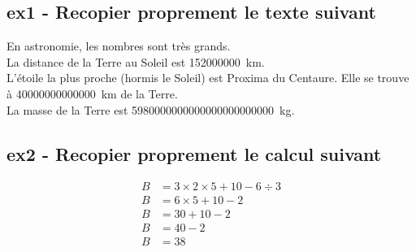\documentclass[11pt]{article}
\begin{document}
\subsection*{ex1 - Recopier proprement le texte suivant}

En astronomie, les nombres sont très grands. \\
La distance de la Terre au Soleil est \SI{152 000 000}{\km}. \\
L'étoile la plus proche (hormis le Soleil) est Proxima du Centaure. Elle se trouve à \SI{40 000 000 000 000}{km} de la Terre.\\
La masse de la Terre est \SI{5 980 000 000 000 000 000 000 000}{kg}.

\subsection*{ex2 - Recopier proprement le calcul suivant }

\begin{align*}
    B &= 3 \times 2 \times 5 + 10 - 6 \div 3  \\
    B &= 6 \times 5 + 10 - 2\\
    B &= 30 + 10 - 2 \\
    B &= 40 - 2\\
    B &= 38\\  
\end{align*}
\end{document}

